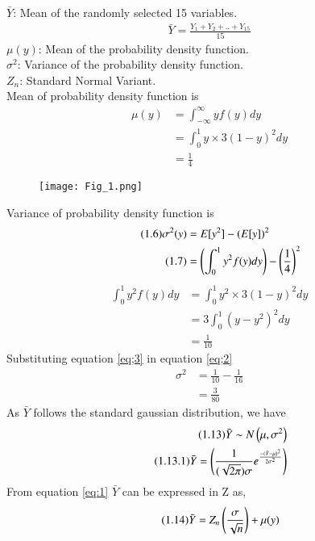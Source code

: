 \documentclass[journal,12pt,twocolumn]{IEEEtran}
\begin{document}
$\bar{Y}$: Mean of the randomly selected 15 variables.
\begin{align}
\tag{1.2}
 \bar{Y}=\frac{Y_{1}+Y_{2}+..+Y_{15}}{15}   
\end{align}
$\mu(y)$: Mean of the probability density function.\\
$\sigma^{2}$: Variance of the probability density function.\\
$Z_{n}$: Standard Normal Variant.\\
Mean of probability density function is\\
\begin{align}
\tag{1.3}
\mu(y)&=\int_{-\infty}^{\infty}yf(y)dy\\
\tag{1.4}
    &=\int_{0}^{1}y\times 3(1-y)^{2}dy\\
\tag{1.5}
    &=\frac{1}{4}
\end{align}
\begin{figure}[ht]
    \centering
    \texttt{[image: Fig\_1.png]}
    \caption{}
    \label{Fig_1}
\end{figure}
Variance of probability density function is
\begin{align}
\tag{1.6}
\sigma^{2}(y)&=E[y^{2}]-(E[y])^{2}\\
\tag{1.7}
\label{eq;2}
      &=\left(\int_{0}^{1}y^{2}f(y)dy\right) - \left(\frac{1}{4}\right)^{2}
\end{align}
\begin{align}
\tag{1.8}
    \int_{0}^{1}y^{2}f(y)dy &= \int_{0}^{1}y^{2}\times3(1-y)^{2}dy\\
\tag{1.9}
                            &=3\int_{0}^{1}(y-y^{2})^{2}dy\\
\tag{1.10}
\label{eq;3}
                            &=\frac{1}{10}
\end{align}
Substituting equation \ref{eq;3} in equation \ref{eq;2}
\begin{align}
\tag{1.11}
 \sigma^{2}&=\frac{1}{10}-\frac{1}{16}\\
\tag{1.12}
           &=\frac{3}{80}
\end{align}
As $\bar{Y}$ follows the standard gaussian distribution, we have
\begin{align}
    \tag{1.13}
\bar{Y}\sim N\left(\mu,\sigma^{2}\right)\\
\tag{1.13.1}
\bar{Y}=\left(\frac{1}{(\sqrt{2\pi})\sigma}e^{\frac{-(\bar{Y}-\mu)^{2}}{2\sigma^{2}}}\right)
\end{align}
From equation \ref{eq:1} $\bar{Y}$ can be expressed in Z as,
\begin{align}
    \tag{1.14}
    \bar{Y}=Z_{n}\left(\frac{\sigma}{\sqrt{n}}\right)+\mu(y)
\end{align}
\end{document}
